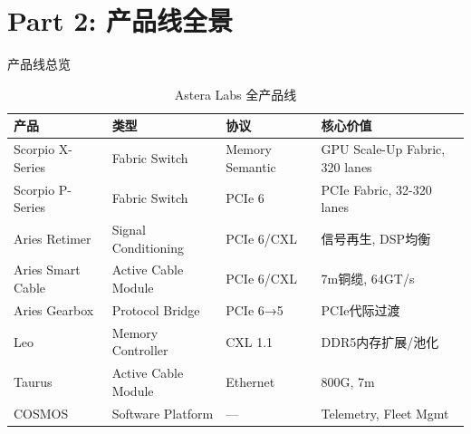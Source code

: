 \documentclass[UTF8,11pt,aspectratio=169]{beamer}
\begin{document}
\section{Part 2: 产品线全景}

\begin{frame}{产品线总览}
    \begin{table}
        \caption{Astera Labs 全产品线}
        \begin{tabular}{lllp{}}
            \toprule
            \textbf{产品} & \textbf{类型} & \textbf{协议} & \textbf{核心价值} \\
            \midrule
            \rowcolor{blue!5}
            Scorpio X-Series & Fabric Switch & Memory Semantic & GPU Scale-Up Fabric, 320 lanes \\
            \rowcolor{blue!5}
            Scorpio P-Series & Fabric Switch & PCIe 6 & PCIe Fabric, 32-320 lanes \\
            \midrule
            Aries Retimer & Signal Conditioning & PCIe 6/CXL & 信号再生, DSP均衡 \\
            Aries Smart Cable & Active Cable Module & PCIe 6/CXL & 7m铜缆, 64GT/s \\
            Aries Gearbox & Protocol Bridge & PCIe 6→5 & PCIe代际过渡 \\
            \midrule
            Leo & Memory Controller & CXL 1.1 & DDR5内存扩展/池化 \\
            \midrule
            Taurus & Active Cable Module & Ethernet & 800G, 7m \\
            \midrule
            COSMOS & Software Platform & — & Telemetry, Fleet Mgmt \\
            \bottomrule
        \end{tabular}
    \end{table}
\end{frame}

\end{document}
